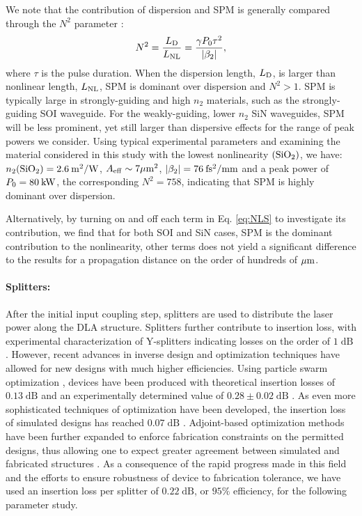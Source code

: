 We note that the contribution of dispersion and SPM is generally compared through the $N^2$ parameter \cite{agrawal2007nonlinear}:
\begin{equation}
N^2=\frac{L_{\rm{D}}}{L_{\rm{NL}}}=\frac{\gamma P_0 \tau^2}{|\beta_2|},
\end{equation}
%
where $\tau$ is the pulse duration. When the dispersion length, $L_{\rm{D}}$, is larger than nonlinear length, $L_{\rm{NL}}$, SPM is dominant over dispersion and $N^2 > 1$. SPM is typically large in strongly-guiding and high $n_2$ materials, such as the strongly-guiding SOI waveguide. For the weakly-guiding, lower $n_2$ SiN waveguides, SPM will be less prominent, yet still larger than dispersive effects for the range of peak powers we consider. Using typical experimental parameters and examining the material considered in this study with the lowest nonlinearity $(\rm{SiO_2})$, we have: $n_2(\rm{SiO_2})=2.6\:m^2/W$, $A_{\rm{eff}}\sim 7\rm{\mu m^2}$, $|\beta_2| = 76\:\rm{fs^2/mm}$ and a peak power of $P_0=80\:\rm{kW}$, the corresponding $N^2=758$, indicating that SPM is highly dominant over dispersion. 

Alternatively, by turning on and off each term in Eq. \ref{eq:NLS} to investigate its contribution, we find that for both SOI and SiN cases, SPM is the dominant contribution to the nonlinearity, other terms does not yield a significant difference to the results for a propagation distance on the order of hundreds of $\rm{\mu m}$.

\paragraph{Splitters:}

After the initial input coupling step, splitters are used to distribute the laser power along the DLA structure.
Splitters further contribute to insertion loss, with experimental characterization of Y-splitters indicating losses on the order of $1\;\text{dB}$ \cite{zhang2013compact}.
However, recent advances in inverse design and optimization techniques have allowed for new designs with much higher efficiencies.
Using particle swarm optimization \cite{eberhart1995new}, devices have been produced with theoretical insertion losses of $0.13\;\text{dB}$ and an experimentally determined value of $0.28 \pm 0.02\;\text{dB}$ \cite{zhang2013compact}.
As even more sophisticated techniques of optimization have been developed, the insertion loss of simulated designs has reached $0.07\;\text{dB}$ \cite{lalau2013adjoint}.
Adjoint-based optimization methods have been further expanded to enforce fabrication constraints on the permitted designs, thus allowing one to expect greater agreement between simulated and fabricated structures \cite{piggott2017fabrication}.
As a consequence of the rapid progress made in this field and the efforts to ensure robustness of device to fabrication tolerance, we have used an insertion loss per splitter of $0.22\;\text{dB}$, or $95\%$ efficiency, for the following parameter study.

